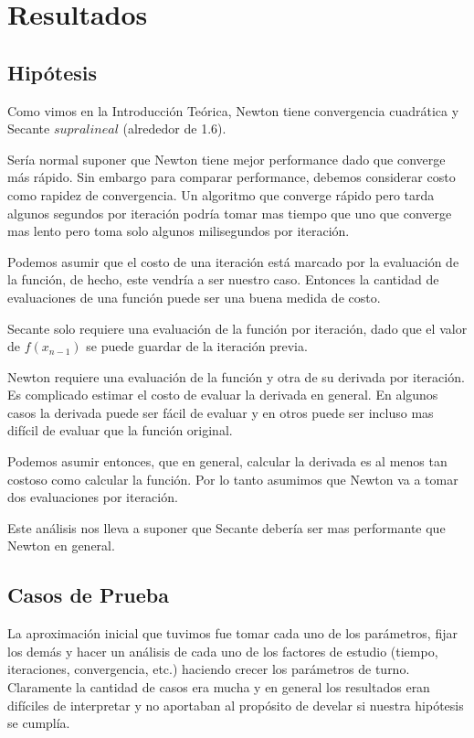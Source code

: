 \section{Resultados}

\subsection{Hipótesis}
Como vimos en la Introducción Teórica, Newton tiene convergencia cuadrática y Secante $supralineal$ (alrededor de 1.6).

Sería normal suponer que Newton tiene mejor performance dado que converge más rápido. Sin embargo para comparar performance, debemos considerar costo como rapidez de convergencia. Un algoritmo que converge rápido pero tarda algunos segundos por iteración podría tomar mas tiempo que uno que converge mas lento pero toma solo algunos milisegundos por iteración.

Podemos asumir que el costo de una iteración está marcado por la evaluación de la función, de hecho, este vendría a ser nuestro caso. Entonces la cantidad de evaluaciones de una función puede ser una buena medida de costo.

Secante solo requiere una evaluación de la función por iteración, dado que el valor de $f(x_{n - 1})$ se puede guardar de la iteración previa.

Newton requiere una evaluación de la función y otra de su derivada por iteración. Es complicado estimar el costo de evaluar la derivada en general. En algunos casos la derivada puede ser fácil de evaluar y en otros puede ser incluso mas difícil de evaluar que la función original.

Podemos asumir entonces, que en general, calcular la derivada es al menos tan costoso como calcular la función. Por lo tanto asumimos que Newton va a tomar dos evaluaciones por iteración.

Este análisis nos lleva a suponer que Secante debería ser mas performante que Newton en general.

\subsection{Casos de Prueba}
La aproximación inicial que tuvimos fue tomar cada uno de los parámetros, fijar los demás y hacer un análisis de cada uno de los factores de estudio (tiempo, iteraciones, convergencia, etc.) haciendo crecer los parámetros de turno. Claramente la cantidad de casos era mucha y en general los resultados eran difíciles de interpretar y no aportaban al propósito de develar si nuestra hipótesis se cumplía.

